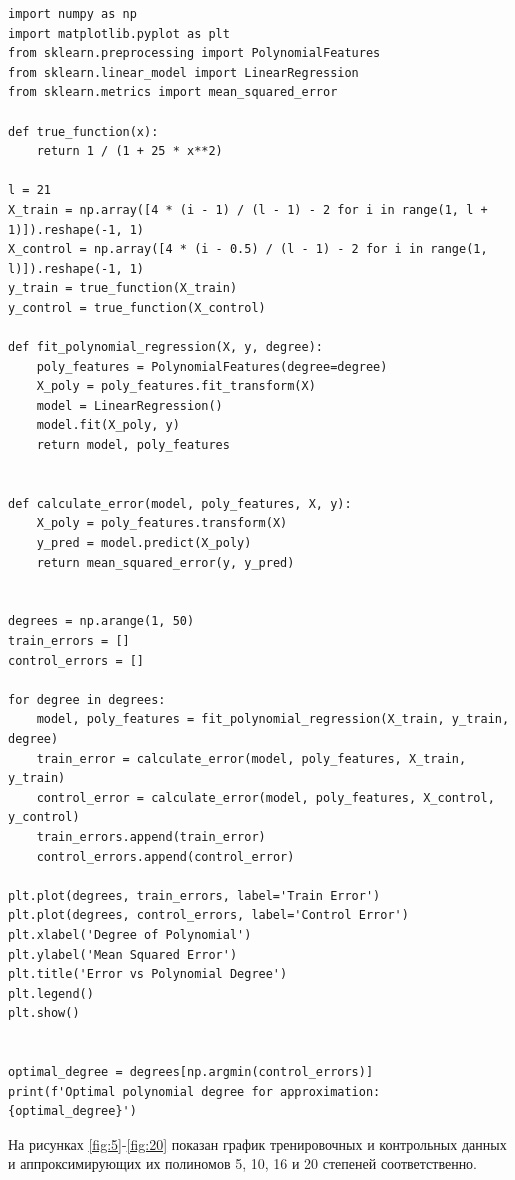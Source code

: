 \documentclass[12pt]{report}
\begin{document}
\begin{lstlisting}[label=lst:gen2,caption=код, решающий поставленную задачу]
import numpy as np
import matplotlib.pyplot as plt
from sklearn.preprocessing import PolynomialFeatures
from sklearn.linear_model import LinearRegression
from sklearn.metrics import mean_squared_error

def true_function(x):
    return 1 / (1 + 25 * x**2)

l = 21
X_train = np.array([4 * (i - 1) / (l - 1) - 2 for i in range(1, l + 1)]).reshape(-1, 1)
X_control = np.array([4 * (i - 0.5) / (l - 1) - 2 for i in range(1, l)]).reshape(-1, 1)
y_train = true_function(X_train)
y_control = true_function(X_control)

def fit_polynomial_regression(X, y, degree):
    poly_features = PolynomialFeatures(degree=degree)
    X_poly = poly_features.fit_transform(X)
    model = LinearRegression()
    model.fit(X_poly, y)
    return model, poly_features


def calculate_error(model, poly_features, X, y):
    X_poly = poly_features.transform(X)
    y_pred = model.predict(X_poly)
    return mean_squared_error(y, y_pred)


degrees = np.arange(1, 50)
train_errors = []
control_errors = []

for degree in degrees:
    model, poly_features = fit_polynomial_regression(X_train, y_train, degree)
    train_error = calculate_error(model, poly_features, X_train, y_train)
    control_error = calculate_error(model, poly_features, X_control, y_control)
    train_errors.append(train_error)
    control_errors.append(control_error)

plt.plot(degrees, train_errors, label='Train Error')
plt.plot(degrees, control_errors, label='Control Error')
plt.xlabel('Degree of Polynomial')
plt.ylabel('Mean Squared Error')
plt.title('Error vs Polynomial Degree')
plt.legend()
plt.show()


optimal_degree = degrees[np.argmin(control_errors)]
print(f'Optimal polynomial degree for approximation: {optimal_degree}')

\end{lstlisting}


На рисунках \ref{fig:5}-\ref{fig:20} показан график тренировочных и контрольных данных и аппроксимирующих их полиномов 5, 10, 16 и 20 степеней соответственно. 
\end{document}
